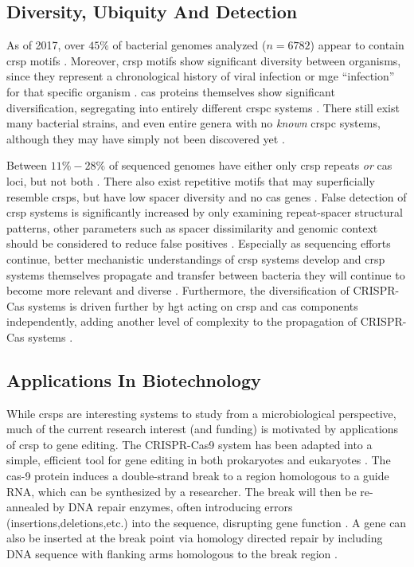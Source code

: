 \subsection{Diversity, Ubiquity And Detection}
As of 2017, over $45\%$ of bacterial genomes analyzed ($n=6782$) appear to contain \ac{crsp} motifs \citep{crispdb}.
Moreover, \ac{crsp} motifs show significant diversity between organisms, since they represent a chronological history of viral infection or \ac{mge} ``infection'' for that specific organism \citep{crispgen}.
\ac{cas} proteins themselves show significant diversification, segregating into entirely different \ac{crspc} systems \citep{evocas}.
There still exist many bacterial strains, and even entire genera with no \textit{known} \ac{crspc} systems, although they may have simply not been discovered yet \citep{ineqcas,casguild}.\par
Between $11\%-28\%$ of sequenced genomes have either only \ac{crsp} repeats \textit{or} \ac{cas} loci, but not both \citep{ineqcas}.
There also exist repetitive motifs that may superficially resemble \ac{crsp}s, but have low spacer diversity and no \ac{cas} genes \citep{ineqcas}.
False detection of \ac{crsp} systems is significantly increased by only examining repeat-spacer structural patterns, other parameters such as spacer dissimilarity and genomic context should be considered to reduce false positives \citep{ineqcas}.
Especially as sequencing efforts continue, better mechanistic understandings of \ac{crsp} systems develop and \ac{crsp} systems themselves propagate and transfer between bacteria they will continue to become more relevant and diverse \citep{crispgen}.
Furthermore, the diversification of CRISPR-Cas systems is driven further by \ac{hgt} acting on \ac{crsp} and \ac{cas} components independently, adding another level of complexity to the propagation of CRISPR-Cas systems \citep{crispgen}.
\subsection{Applications In Biotechnology}
While \ac{crsp}s are interesting systems to study from a microbiological perspective, much of the current research interest (and funding) is motivated by applications of \ac{crsp} to gene editing.
The CRISPR-Cas9 system has been adapted into a simple, efficient tool for gene editing in both prokaryotes and eukaryotes \citep{crispgen}.
The \ac{cas}-9 protein induces a double-strand break to a region homologous to a guide RNA, which can be synthesized by a researcher.
The break will then be re-annealed by DNA repair enzymes, often introducing errors (insertions,deletions,etc.) into the sequence, disrupting gene function \citep{crispgen}.
A gene can also be inserted at the break point via homology directed repair by including DNA sequence with flanking arms homologous to the break region \citep{crispgen}.
